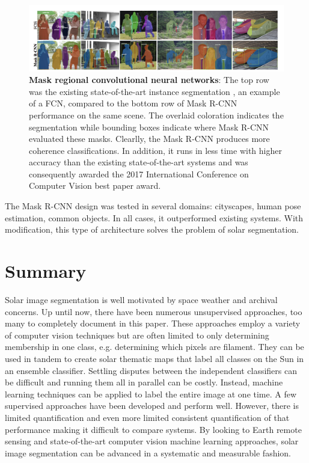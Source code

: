 \documentclass[twoside]{report}
\begin{document}
\begin{figure}[ht]
  \begin{center}
    \includegraphics[scale=0.5]{mrcnn.png}
    \caption{{\bf Mask regional convolutional neural networks}: The top row was the existing state-of-the-art instance segmentation \cite{li2016fully}, an example of a FCN, compared to the bottom row of Mask R-CNN performance on the same scene. The overlaid coloration indicates the segmentation while bounding boxes indicate where Mask R-CNN evaluated these masks. Clearlly, the Mask R-CNN produces more coherence classifications. In addition, it runs in less time with higher accuracy than the existing state-of-the-art systems and was consequently awarded the 2017 International Conference on Computer Vision best paper award.}
    \label{fig:mrcnn}
 \end{center}
\end{figure}

The Mask R-CNN design was tested in several domains: cityscapes, human pose estimation, common objects. In all cases, it outperformed existing systems. With modification, this type of architecture solves the problem of solar segmentation. 

\section{Summary}
Solar image segmentation is well motivated by space weather and archival concerns. Up until now, there have been numerous unsupervised approaches, too many to completely document in this paper. These approaches employ a variety of computer vision techniques but are often limited to only determining membership in one class, e.g. determining which pixels are filament. They can be used in tandem to create solar thematic maps that label all classes on the Sun in an ensemble classifier. Settling disputes between the independent classifiers can be difficult and running them all in parallel can be costly. Instead, machine learning techniques can be applied to label the entire image at one time. A few supervised approaches have been developed and perform well. However, there is limited quantification and even more limited consistent quantification of that performance making it difficult to compare systems. By looking to Earth remote sensing and state-of-the-art computer vision machine learning approaches, solar image segmentation can be advanced in a systematic and measurable fashion. 
\end{document}
